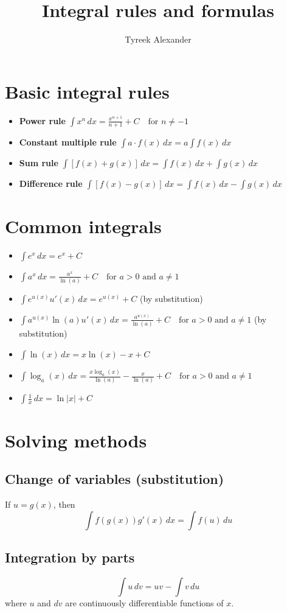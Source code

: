 \documentclass{article}
\begin{document}
\title{Integral rules and formulas}
\author{Tyreek Alexander}
\date{}
\maketitle

\section*{Basic integral rules}
\begin{itemize}
    \item \textbf{Power rule} \(\int x^n \, dx = \frac{x^{n+1}}{n+1} + C \quad \text{for } n \neq -1\)
    \item \textbf{Constant multiple rule} \(\int a \cdot f(x) \, dx = a \int f(x) \, dx\)
    \item \textbf{Sum rule} \(\int [f(x) + g(x)] \, dx = \int f(x) \, dx + \int g(x) \, dx\)
    \item \textbf{Difference rule} \(\int [f(x) - g(x)] \, dx = \int f(x) \, dx - \int g(x) \, dx\)
\end{itemize}

\section*{Common integrals}
\begin{itemize}
    \item \(\int e^x \, dx = e^x + C\)
    \item \(\int a^x \, dx = \frac{a^x}{\ln(a)} + C \quad \text{for } a > 0 \text{ and } a \neq 1\)
    \item \(\int e^{u(x)} u'(x) \, dx = e^{u(x)} + C\) (by substitution)
    \item \(\int a^{u(x)} \ln(a) u'(x) \, dx = \frac{a^{u(x)}}{\ln(a)} + C \quad \text{for } a > 0 \text{ and } a \neq 1\) (by substitution)
    \item \(\int \ln(x) \, dx = x \ln(x) - x + C\)
    \item \(\int \log_a(x) \, dx = \frac{x \log_a(x)}{\ln(a)} - \frac{x}{\ln(a)} + C \quad \text{for } a > 0 \text{ and } a \neq 1\)
    \item \(\int \frac{1}{x} \, dx = \ln|x| + C\)
\end{itemize}

\section*{Solving methods}

\subsection*{Change of variables (substitution)}
If \( u = g(x) \), then
\[
\int f(g(x)) g'(x) \, dx = \int f(u) \, du
\]

\subsection*{Integration by parts}
\[
\int u \, dv = uv - \int v \, du
\]
where \( u \) and \( dv \) are continuously differentiable functions of \( x \).
\end{document}
